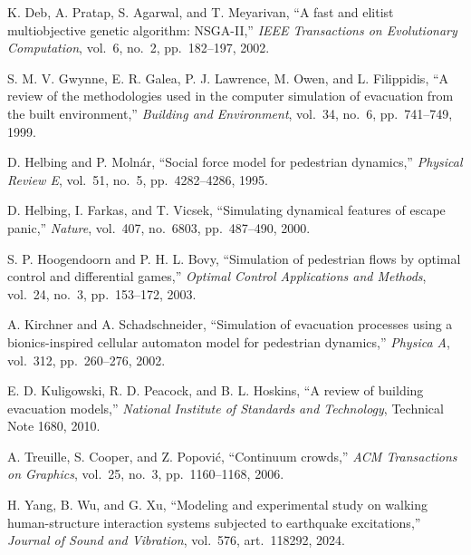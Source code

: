 \documentclass[11pt,a4paper]{article}
\begin{document}
\begin{thebibliography}{99}

 K. Deb, A. Pratap, S. Agarwal, and T. Meyarivan, “A fast and elitist multiobjective genetic algorithm: NSGA-II,” \emph{IEEE Transactions on Evolutionary Computation}, vol.~6, no.~2, pp.~182--197, 2002.

 S. M. V. Gwynne, E. R. Galea, P. J. Lawrence, M. Owen, and L. Filippidis, “A review of the methodologies used in the computer simulation of evacuation from the built environment,” \emph{Building and Environment}, vol.~34, no.~6, pp.~741--749, 1999.

 D. Helbing and P. Molnár, “Social force model for pedestrian dynamics,” \emph{Physical Review E}, vol.~51, no.~5, pp.~4282--4286, 1995.

 D. Helbing, I. Farkas, and T. Vicsek, “Simulating dynamical features of escape panic,” \emph{Nature}, vol.~407, no.~6803, pp.~487--490, 2000.

 S. P. Hoogendoorn and P. H. L. Bovy, “Simulation of pedestrian flows by optimal control and differential games,” \emph{Optimal Control Applications and Methods}, vol.~24, no.~3, pp.~153--172, 2003.

 A. Kirchner and A. Schadschneider, “Simulation of evacuation processes using a bionics-inspired cellular automaton model for pedestrian dynamics,” \emph{Physica A}, vol.~312, pp.~260--276, 2002.

 E. D. Kuligowski, R. D. Peacock, and B. L. Hoskins, “A review of building evacuation models,” \emph{National Institute of Standards and Technology}, Technical Note 1680, 2010.

 A. Treuille, S. Cooper, and Z. Popović, “Continuum crowds,” \emph{ACM Transactions on Graphics}, vol.~25, no.~3, pp.~1160--1168, 2006.

 H. Yang, B. Wu, and G. Xu, “Modeling and experimental study on walking human-structure interaction systems subjected to earthquake excitations,” \emph{Journal of Sound and Vibration}, vol.~576, art.~118292, 2024.

\end{thebibliography}
\end{document}
